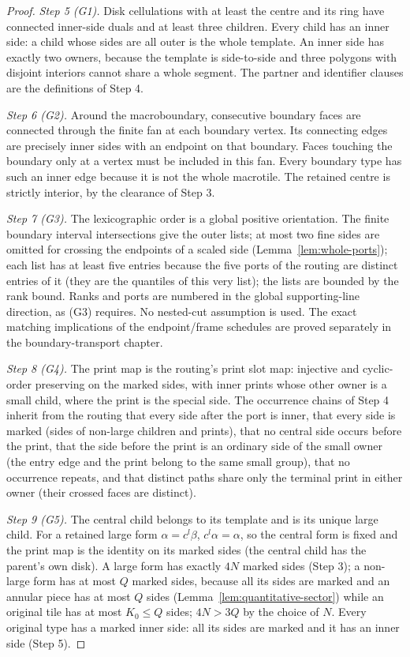 \begin{proof}
\emph{Step 5 (G1).}  Disk cellulations with at least the centre and its ring
have connected inner-side duals and at least three children.  Every child has
an inner side: a child whose sides are all outer is the whole template.  An
inner side has exactly two owners, because the template is side-to-side and
three polygons with disjoint interiors cannot share a whole segment.  The
partner and identifier clauses are the definitions of Step 4.

\emph{Step 6 (G2).}  Around the macroboundary, consecutive boundary faces are
connected through the finite fan at each boundary vertex.  Its connecting
edges are precisely inner sides with an endpoint on that boundary.  Faces
touching the boundary only at a vertex must be included in this fan.  Every
boundary type has such an inner edge because it is not the whole macrotile.
The retained centre is strictly interior, by the clearance of Step 3.

\emph{Step 7 (G3).}  The lexicographic order is a global positive
orientation.  The finite boundary interval intersections give the outer
lists; at most two fine sides are omitted for crossing the endpoints of a
scaled side (Lemma~\ref{lem:whole-ports}); each list has at least five
entries because the five ports of the routing are distinct entries of it
(they are the quantiles of this very list); the lists are bounded by the rank
bound.  Ranks and ports are numbered in the global supporting-line direction,
as (G3) requires.  No nested-cut assumption is used.  The exact matching
implications of the endpoint/frame schedules are proved separately in the
boundary-transport chapter.

\emph{Step 8 (G4).}  The print map is the routing's print slot map: injective
and cyclic-order preserving on the marked sides, with inner prints whose other
owner is a small child, where the print is the special side.  The occurrence
chains of Step 4 inherit from the routing that every side after the port is
inner, that every side is marked (sides of non-large children and prints),
that no central side occurs before the print, that the side before the print
is an ordinary side of the small owner (the entry edge and the print belong
to the same small group), that no occurrence repeats, and that distinct paths
share only the terminal print in either owner (their crossed faces are
distinct).

\emph{Step 9 (G5).}  The central child belongs to its template and is its
unique large child.  For a retained large form $\alpha=c^l\beta$,
$c^l\alpha=\alpha$, so the central form is fixed and the print map is the
identity on its marked sides (the central child has the parent's own disk).
A large form has exactly $4N$ marked sides (Step 3); a non-large form has at
most $Q$ marked sides, because all its sides are marked and an annular piece
has at most $Q$ sides (Lemma~\ref{lem:quantitative-sector}) while an original
tile has at most $K_0\le Q$ sides; $4N>3Q$ by the choice of $N$.  Every
original type has a marked inner side: all its sides are marked and it has an
inner side (Step 5).


\end{proof}
